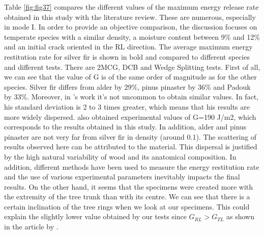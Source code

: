 Table \ref{fig:fig37} compares the different values of the maximum energy release rate obtained in this study with the literature review. These are numerous, especially in mode I. In order to provide an objective comparison, the discussion focuses on temperate species with a similar density, a moisture content between 9\% and 12\% and an initial crack oriented in the RL direction. The average maximum energy restitution rate for silver fir is shown in bold and compared to different species and different tests. There are 2MCG, DCB and Wedge Splitting tests.
First of all, we can see that the value of G is of the same order of magnitude as for the other species. Silver fir differs from alder by $29 \%$, pinus pinaster by $36 \%$ and Padouk by $33 \%$. Moreover, in \cite{Odounga2018phd}'s work it's not uncommon to obtain similar values. In fact, his standard deviation is 2 to 3 times greater, which means that his results are more widely dispersed.
\cite{Xavieretal2014} also obtained experimental values of G=190 J/m2, which corresponds to the results obtained in this study. In addition, alder and pinus pinaster are not very far from silver fir in density (around 0.1).
The scattering of results observed here can be attributed to the material. This dispersal is justified by the high natural variability of wood and its anatomical composition.
In addition, different methods have been used to measure the energy restitution rate and the use of various experimental parameters inevitably impacts the final results.
On the other hand, it seems that the specimens were created more with the extremity of the tree trunk than with its centre. We can see that there is a certain inclination of the tree rings when we look at our specimens. This could explain the slightly lower value obtained by our tests since $G_{RL}> G_{TL}$ as shown in the article by \cite{Reiterer2002}.

